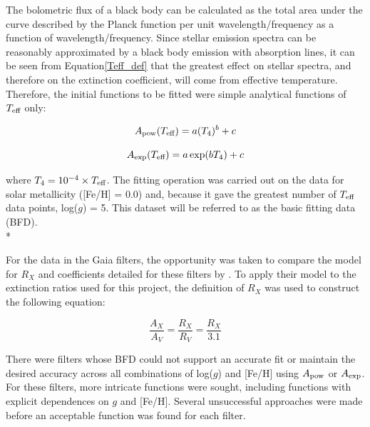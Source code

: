 \documentclass[12pt, a4paper]{report}
\begin{document}
The bolometric flux of a black body can be calculated as the total area under the curve described by the Planck function per unit wavelength/frequency as a function of wavelength/frequency. Since stellar emission spectra can be reasonably approximated by a black body emission with absorption lines, it can be seen from Equation\ref{Teff_def} that the greatest effect on stellar spectra, and therefore on the extinction coefficient, will come from effective temperature. Therefore, the initial functions to be fitted were simple analytical functions of $T_{\textnormal{eff}}$ only:

\begin{equation}
A_{\textnormal{pow}} (T_{\textnormal{eff}}) = a (T_{4})^{b} + c
\label{Teff_pow}
\end{equation}

\begin{equation}
A_{\textnormal{exp}} (T_{\textnormal{eff}}) = a \exp(b T_{4}) + c
\label{Teff_exp}
\end{equation}

where $T_{4} = 10^{-4} \times T_{\textnormal{eff}}$. The fitting operation was carried out on the data for solar metallicity ([Fe/H] = 0.0) and, because it gave the greatest number of $T_{\textnormal{eff}}$ data points, log($g$) = 5. This dataset will be referred to as the basic fitting data (BFD).\\*

For the data in the Gaia filters, the opportunity was taken to compare the model for $R_{X}$ and coefficients detailed for these filters by \cite{2018MNRAS.479L.102C}. To apply their model to the extinction ratios used for this project, the definition of $R_{X}$ was used to construct the following equation:

\begin{equation}
\frac{A_{X}}{A_{V}} = \frac{R_{X}}{R_{V}} = \frac{R_{X}}{3.1}
\label{convert_Rx_to_Ax}
\end{equation}

There were filters whose BFD could not support an accurate fit or maintain the desired accuracy across all combinations of log($g$) and [Fe/H] using $A_{\textnormal{pow}}$ or $A_{\textnormal{exp}}$. For these filters, more intricate functions were sought, including functions with explicit dependences on $g$ and [Fe/H]. Several unsuccessful approaches were made before an acceptable function was found for each filter.
\end{document}
